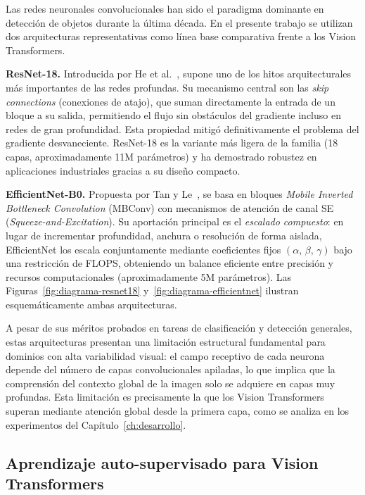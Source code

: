Las redes neuronales convolucionales han sido el paradigma dominante en detección de objetos durante la última década. En el presente trabajo se utilizan dos arquitecturas representativas como línea base comparativa frente a los Vision Transformers.

\textbf{ResNet-18.} Introducida por He et al.~\cite{he2016resnet}, supone uno de los hitos arquitecturales más importantes de las redes profundas. Su mecanismo central son las \textit{skip connections} (conexiones de atajo), que suman directamente la entrada de un bloque a su salida, permitiendo el flujo sin obstáculos del gradiente incluso en redes de gran profundidad. Esta propiedad mitigó definitivamente el problema del gradiente desvaneciente. ResNet-18 es la variante más ligera de la familia (18 capas, aproximadamente 11M parámetros) y ha demostrado robustez en aplicaciones industriales gracias a su diseño compacto.

\textbf{EfficientNet-B0.} Propuesta por Tan y Le~\cite{tan2019efficientnet}, se basa en bloques \textit{Mobile Inverted Bottleneck Convolution} (MBConv) con mecanismos de atención de canal SE (\textit{Squeeze-and-Excitation}). Su aportación principal es el \textit{escalado compuesto}: en lugar de incrementar profundidad, anchura o resolución de forma aislada, EfficientNet los escala conjuntamente mediante coeficientes fijos $(\alpha,\,\beta,\,\gamma)$ bajo una restricción de FLOPS, obteniendo un balance eficiente entre precisión y recursos computacionales (aproximadamente 5M parámetros). Las Figuras~\ref{fig:diagrama-resnet18} y~\ref{fig:diagrama-efficientnet} ilustran esquemáticamente ambas arquitecturas.

A pesar de sus méritos probados en tareas de clasificación y detección generales, estas arquitecturas presentan una limitación estructural fundamental para dominios con alta variabilidad visual: el campo receptivo de cada neurona depende del número de capas convolucionales apiladas, lo que implica que la comprensión del contexto global de la imagen solo se adquiere en capas muy profundas. Esta limitación es precisamente la que los Vision Transformers superan mediante atención global desde la primera capa, como se analiza en los experimentos del Capítulo~\ref{ch:desarrollo}.

\subsection{Aprendizaje auto-supervisado para Vision Transformers}

